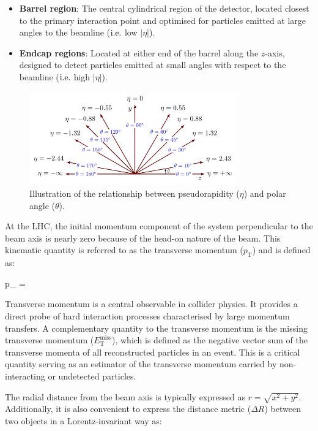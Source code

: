 \begin{itemize} 
\item \textbf{Barrel region}: The central cylindrical region of the detector, located closest to the primary interaction point and optimised for particles emitted at large angles to the beamline ($\mbox{i.e.}$ low $|\eta|$). 
\item \textbf{Endcap regions}: Located at either end of the barrel along the $z$-axis, designed to detect particles emitted at small angles with respect to the beamline ($\mbox{i.e.}$ high $|\eta|$). 
\end{itemize}

\begin{figure}[!htbp]
\centering
\includegraphics[width= 0.8\textwidth]{Figures/Chapter3/Pseudorapidity.pdf}
\caption{Illustration of the relationship between pseudorapidity ($\eta$) and polar angle ($\theta$).}
\label{Figure:Chapter3_Pseudorapidity}
\end{figure}

At the \ac{LHC}, the initial momentum component of the system perpendicular to the beam axis is nearly zero because of the head-on nature of the beam. This kinematic quantity is referred to as the transverse momentum ($p_\mathrm{T}$) and is defined as:

\begin{equation_pad}
    p_ = 
\end{equation_pad}

Transverse momentum is a central observable in collider physics. It provides a direct probe of hard interaction processes characterised by large momentum transfers. A complementary quantity to the transverse momentum is the missing transverse momentum ($E_\mathrm{T}^{\text{miss}}$), which is defined as the negative vector sum of the transverse momenta of all reconstructed particles in an event. This is a critical quantity serving as an estimator of the transverse momentum carried by non-interacting or undetected particles.

The radial distance from the beam axis is typically expressed as $r = \sqrt{x^2+y^2}$. Additionally, it is also convenient to express the distance metric ($\Delta R$) between two objects in a Lorentz-invariant way as:

